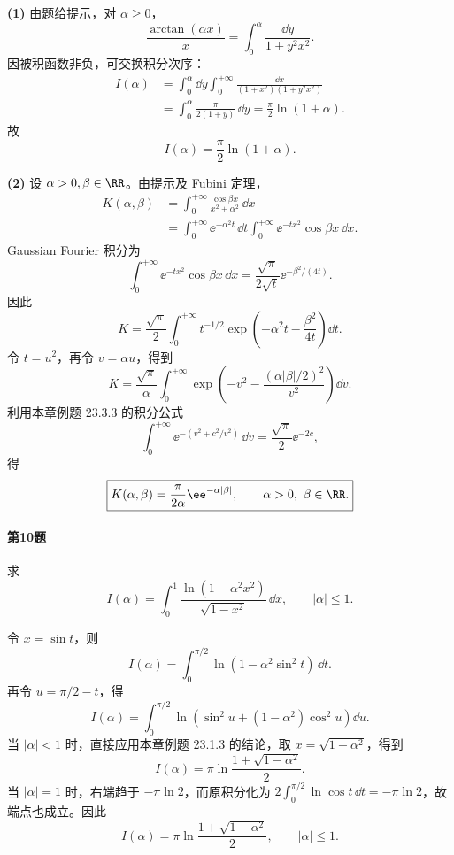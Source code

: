 \begin{xsolution}
\textbf{(1)} 由题给提示，对 $\alpha\geqslant0$，
\[
\frac{\arctan(\alpha x)}x
=\int_0^\alpha\frac{\dd y}{1+y^2x^2}.
\]
因被积函数非负，可交换积分次序：
\[
\begin{aligned}
I(\alpha)
&=\int_0^\alpha\dd y\int_0^{+\infty}
\frac{\dd x}{(1+x^2)(1+y^2x^2)}\\
&=\int_0^\alpha\frac\pi{2(1+y)}\,\dd y
=\frac\pi2\ln(1+\alpha).
\end{aligned}
\]
故
\[
\boxed{I(\alpha)=\frac\pi2\ln(1+\alpha)}.
\]

\textbf{(2)} 设 $\alpha>0,\beta\in\RR$。由提示及 Fubini 定理，
\[
\begin{aligned}
K(\alpha,\beta)
&=\int_0^{+\infty}\frac{\cos\beta x}{x^2+\alpha^2}\,\dd x\\
&=\int_0^{+\infty}\ee^{-\alpha^2t}\,\dd t
\int_0^{+\infty}\ee^{-tx^2}\cos\beta x\,\dd x.
\end{aligned}
\]
Gaussian Fourier 积分为
\[
\int_0^{+\infty}\ee^{-tx^2}\cos\beta x\,\dd x
=\frac{\sqrt\pi}{2\sqrt t}\ee^{-\beta^2/(4t)}.
\]
因此
\[
K=\frac{\sqrt\pi}{2}\int_0^{+\infty}
t^{-1/2}\exp\left(-\alpha^2t-\frac{\beta^2}{4t}\right)\dd t.
\]
令 $t=u^2$，再令 $v=\alpha u$，得到
\[
K=\frac{\sqrt\pi}{\alpha}
\int_0^{+\infty}\exp\left(-v^2-\frac{(\alpha|\beta|/2)^2}{v^2}\right)\dd v.
\]
利用本章例题 23.3.3 的积分公式
\[
\int_0^{+\infty}\ee^{-(v^2+c^2/v^2)}\,\dd v
=\frac{\sqrt\pi}{2}\ee^{-2c},
\]
得
\[
\boxed{
K(\alpha,\beta)=\frac\pi{2\alpha}\ee^{-\alpha|\beta|},
\qquad \alpha>0,\ \beta\in\RR.}
\]
\end{xsolution}

\paragraph{第10题}
求
\[
I(\alpha)=\int_0^1\frac{\ln(1-\alpha^2x^2)}{\sqrt{1-x^2}}\,\dd x,
\qquad |\alpha|\leqslant1.
\]

\begin{xsolution}
令 $x=\sin t$，则
\[
I(\alpha)=\int_0^{\pi/2}\ln(1-\alpha^2\sin^2t)\,\dd t.
\]
再令 $u=\pi/2-t$，得
\[
I(\alpha)=\int_0^{\pi/2}
\ln\left(\sin^2u+(1-\alpha^2)\cos^2u\right)\dd u.
\]
当 $|\alpha|<1$ 时，直接应用本章例题 23.1.3 的结论，取
$x=\sqrt{1-\alpha^2}$，得到
\[
I(\alpha)=\pi\ln\frac{1+\sqrt{1-\alpha^2}}2.
\]
当 $|\alpha|=1$ 时，右端趋于 $-\pi\ln2$，而原积分化为
$2\int_0^{\pi/2}\ln\cos t\,\dd t=-\pi\ln2$，故端点也成立。因此
\[
\boxed{
I(\alpha)=\pi\ln\frac{1+\sqrt{1-\alpha^2}}2,
\qquad |\alpha|\leqslant1.}
\]
\end{xsolution}

